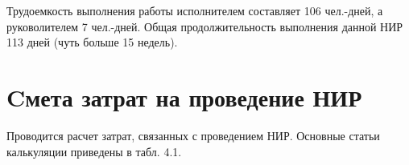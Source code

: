 Трудоемкость выполнения работы исполнителем  составляет 106 чел.-дней, а руковолителем 7 чел.-дней.
Общая продолжительность выполнения данной НИР 113 дней (чуть больше 15 недель).

\section{Cмета затрат на проведение НИР}

Проводится расчет затрат, связанных с проведением НИР. Основные статьи калькуляции приведены в табл. 4.1.

